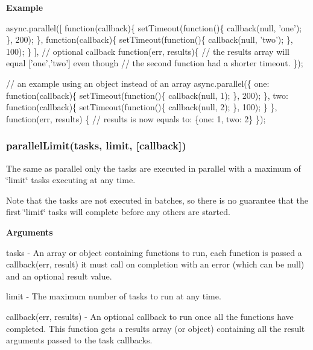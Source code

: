 {\bfseries Example}


\begin{DoxyCode}
async.parallel([
    function(callback)\{
        setTimeout(function()\{
            callback(null, 'one');
        \}, 200);
    \},
    function(callback)\{
        setTimeout(function()\{
            callback(null, 'two');
        \}, 100);
    \}
],
// optional callback
function(err, results)\{
    // the results array will equal ['one','two'] even though
    // the second function had a shorter timeout.
\});


// an example using an object instead of an array
async.parallel(\{
    one: function(callback)\{
        setTimeout(function()\{
            callback(null, 1);
        \}, 200);
    \},
    two: function(callback)\{
        setTimeout(function()\{
            callback(null, 2);
        \}, 100);
    \}
\},
function(err, results) \{
    // results is now equals to: \{one: 1, two: 2\}
\});
\end{DoxyCode}
 



\label{_parallel}%
 \subsubsection*{parallel\+Limit(tasks, limit, \mbox{[}callback\mbox{]})}

The same as parallel only the tasks are executed in parallel with a maximum of \char`\"{}limit\char`\"{} tasks executing at any time.

Note that the tasks are not executed in batches, so there is no guarantee that the first \char`\"{}limit\char`\"{} tasks will complete before any others are started.

{\bfseries Arguments}


\begin{DoxyItemize}
\item tasks -\/ An array or object containing functions to run, each function is passed a callback(err, result) it must call on completion with an error (which can be null) and an optional result value.
\item limit -\/ The maximum number of tasks to run at any time.
\item callback(err, results) -\/ An optional callback to run once all the functions have completed. This function gets a results array (or object) containing all the result arguments passed to the task callbacks. 


\end{DoxyItemize}

